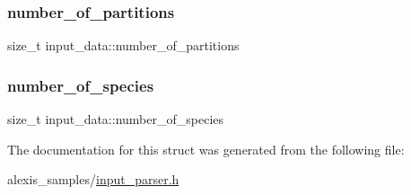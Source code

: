 \mbox{\label{structinput__data_ae07405c95174763dd88371d85b6d35a3}} 
\subsubsection{\texorpdfstring{number\+\_\+of\+\_\+partitions}{number\_of\_partitions}}
{\footnotesize\ttfamily size\+\_\+t input\+\_\+data\+::number\+\_\+of\+\_\+partitions}

\mbox{\label{structinput__data_a10d4f562a6b9dbda373a6fbe9a99e9fe}} 
\subsubsection{\texorpdfstring{number\+\_\+of\+\_\+species}{number\_of\_species}}
{\footnotesize\ttfamily size\+\_\+t input\+\_\+data\+::number\+\_\+of\+\_\+species}



The documentation for this struct was generated from the following file\+:\begin{DoxyCompactItemize}
\item 
alexis\+\_\+samples/\hyperlink{input__parser_8h}{input\+\_\+parser.\+h}\end{DoxyCompactItemize}
